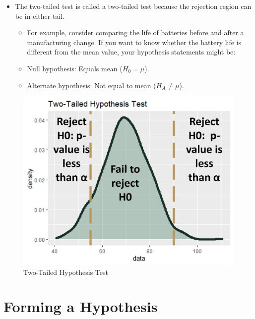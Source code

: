 \documentclass[
  letterpaper,
  DIV=11,
  numbers=noendperiod]{scrreprt}
\providecommand{\tightlist}{%
  \setlength{\itemsep}{0pt}\setlength{\parskip}{0pt}}\usepackage{longtable,booktabs,array}
\begin{document}
\begin{itemize}
\tightlist
\item
  The two-tailed test is called a two-tailed test because the rejection
  region can be in either tail.

  \begin{itemize}
  \tightlist
  \item
    For example, consider comparing the life of batteries before and
    after a manufacturing change. If you want to know whether the
    battery life is different from the mean value, your hypothesis
    statements might be:
  \item
    Null hypothesis: Equals mean (\(H_0 = \mu\)).
  \item
    Alternate hypothesis: Not equal to mean (\(H_A \neq \mu\)).
  \end{itemize}
\end{itemize}

\begin{figure}[H]

{\centering \includegraphics{Pictures/Ch6/TwoTailedHTest.png}

}

\caption{Two-Tailed Hypothesis Test}

\end{figure}%

\section{Forming a Hypothesis}\label{forming-a-hypothesis}
\end{document}
